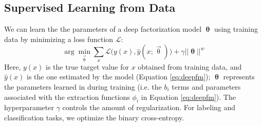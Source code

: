 \documentclass{article}
\newcommand{\vect}[1]{\vec{#1}}
\renewcommand{\cite}[1]{\citep{#1}}
\begin{document}
\subsection{Supervised Learning from Data}
\label{sec:learning_supervised}

We can learn the the parameters of a deep factorization model $ \bm\uptheta$ using training data by minimizing a loss function $\mathcal L$:
\label{sec:learning}
\begin{equation}
\arg \min_{\vect{\uptheta}} \sum_x  \mathcal{L}\bigl(  y(x), \hat y(x;\vect{\uptheta})\bigr) + \gamma ||  \bm{\uptheta}||^{w}
\label{eq:learning}
\end{equation}
Here, $y(x)$  is the true target value for $x$ obtained from training data, and $\hat{y}(x)$ is the one estimated by the model (Equation \ref{eq:deepfm});
$\bm\uptheta$ represents the parameters learned in during training (i.e. the $b_i$ terms and parameters associated with the extraction functions $\phi_i$ in Equation \ref{eq:deepfm}).
The hyperparameter $\gamma$ controls the amount of regularization.
For labeling and classification tasks, we optimize the binary cross-entropy.


\end{document}
